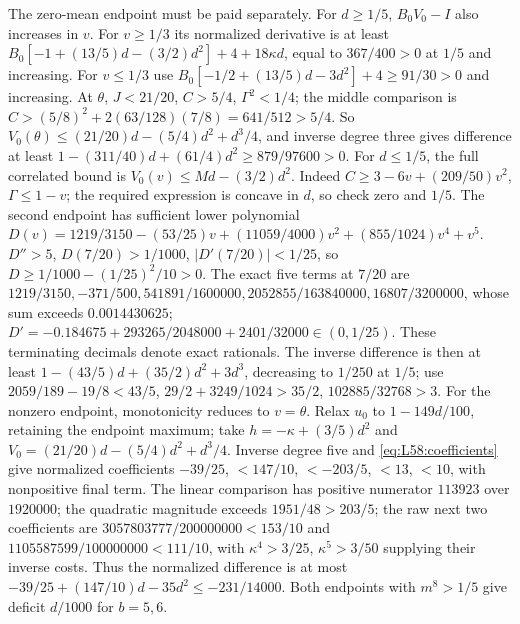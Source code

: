 The zero-mean endpoint must be paid separately.
For $d\ge1/5$, $B_0V_0-I$ also increases in $v$.
For $v\ge1/3$ its normalized derivative is at least
$B_0[-1+(13/5)d-(3/2)d^2]+4+18\kappa d$,
equal to $367/400>0$ at $1/5$ and increasing.
For $v\le1/3$ use
$B_0[-1/2+(13/5)d-3d^2]+4\ge91/30>0$ and increasing.
At $\theta$, $J<21/20$, $C>5/4$,
$\Gamma^2<1/4$; the middle comparison is
$C>(5/8)^2+2(63/128)(7/8)=641/512>5/4$.
So $V_0(\theta)\le(21/20)d-(5/4)d^2+d^3/4$, and inverse degree
three gives difference at least
$1-(311/40)d+(61/4)d^2\ge879/97600>0$.
For $d\le1/5$, the full correlated bound is
$V_0(v)\le Md-(3/2)d^2$.
Indeed $C\ge3-6v+(209/50)v^2$, $\Gamma\le1-v$;
the required expression is concave in $d$, so check zero and $1/5$.
The second endpoint has sufficient lower polynomial
$D(v)=1219/3150-(53/25)v+(11059/4000)v^2+(855/1024)v^4+v^5$.
$D''>5$, $D(7/20)>1/1000$, $|D'(7/20)|<1/25$, so
$D\ge1/1000-(1/25)^2/10>0$.
The exact five terms at $7/20$ are
$1219/3150,\allowbreak -371/500,\allowbreak 541891/1600000,\allowbreak 2052855/163840000,\allowbreak 
16807/3200000$, whose sum exceeds $0.0014430625$;
$D'=-0.184675+293265/2048000+2401/32000\in(0,1/25)$.
These terminating decimals denote exact rationals.
The inverse difference is then at least
$1-(43/5)d+(35/2)d^2+3d^3$, decreasing to $1/250$ at $1/5$;
use $2059/189-19/8<43/5$,
$29/2+3249/1024>35/2$, $102885/32768>3$.
For the nonzero endpoint, monotonicity reduces to $v=\theta$.
Relax $u_0$ to $1-149d/100$, retaining the endpoint maximum;
take $h=-\kappa+(3/5)d^2$ and
$V_0=(21/20)d-(5/4)d^2+d^3/4$.
Inverse degree five and \eqref{eq:L58:coefficients} give normalized
coefficients $-39/25$, $<147/10$, $<-203/5$, $<13$, $<10$,
with nonpositive final term.
The linear comparison has positive numerator $113923$ over $1920000$;
the quadratic magnitude exceeds $1951/48>203/5$;
the raw next two coefficients are
$3057803777/200000000<153/10$ and
$1105587599/100000000<111/10$, with
$\kappa^4>3/25$, $\kappa^5>3/50$ supplying their inverse costs.
Thus the normalized difference is at most
$-39/25+(147/10)d-35d^2\le-231/14000$.
Both endpoints with $m^8>1/5$ give deficit $d/1000$ for $b=5,6$.

